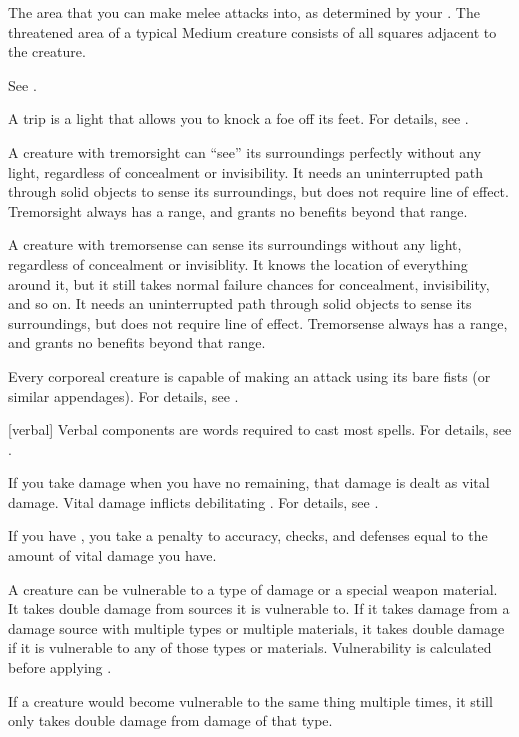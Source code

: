  The area that you can make melee attacks into, as determined by your .
The threatened area of a typical Medium creature consists of all squares adjacent to the creature.

 See .

 A trip is a light  that allows you to knock a foe off its feet.
For details, see .

 A creature with tremorsight can ``see'' its surroundings perfectly without any light, regardless of concealment or invisibility.
It needs an uninterrupted path through solid objects to sense its surroundings, but does not require line of effect.
Tremorsight always has a range, and grants no benefits beyond that range.

 A creature with tremorsense can sense its surroundings without any light, regardless of concealment or invisiblity.
It knows the location of everything around it, but it still takes normal failure chances for concealment, invisibility, and so on.
It needs an uninterrupted path through solid objects to sense its surroundings, but does not require line of effect.
Tremorsense always has a range, and grants no benefits beyond that range.

 Every corporeal creature is capable of making an attack using its bare fists (or similar appendages).
For details, see .

[verbal] Verbal components are words required to cast most spells.
For details, see .

 If you take damage when you have no  remaining, that damage is dealt as vital damage.
Vital damage inflicts debilitating .
For details, see .

 If you have , you take a penalty to accuracy, checks, and defenses equal to the amount of vital damage you have.

 A creature can be vulnerable to a type of damage or a special weapon material.
It takes double damage from sources it is vulnerable to.
If it takes damage from a damage source with multiple types or multiple materials, it takes double damage if it is vulnerable to any of those types or materials.
Vulnerability is calculated before applying .
\par If a creature would become vulnerable to the same thing multiple times, it still only takes double damage from damage of that type.

